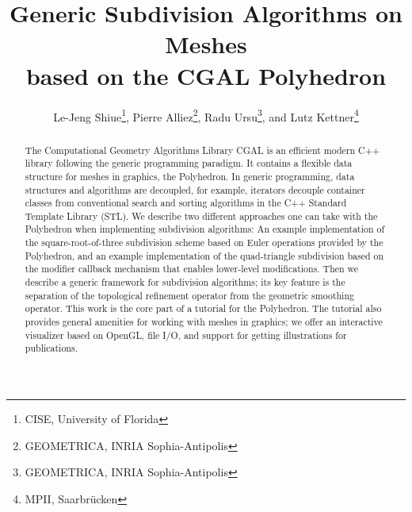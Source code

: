 \documentclass{egpubl}
\title{Generic Subdivision Algorithms on Meshes \\ 
       based on the CGAL Polyhedron}
\author[Le-Jeng Shiue, Pierre Alliez, Radu Ursu, and Lutz Kettner]
       {Le-Jeng Shiue\thanks{CISE, University of Florida},
        Pierre Alliez\thanks{GEOMETRICA, INRIA Sophia-Antipolis},
        Radu Ursu\thanks{GEOMETRICA, INRIA Sophia-Antipolis}, and
        Lutz Kettner\thanks{MPII, Saarbr\"ucken}
       }
\begin{document}
\maketitle

\begin{abstract}

  
The Computational Geometry Algorithms Library CGAL is an efficient
modern C++ library following the generic programming paradigm. It
contains a flexible data structure for meshes in graphics, the
Polyhedron. In generic programming, data structures and algorithms are
decoupled, for example, iterators decouple container classes from
conventional search and sorting algorithms in the C++ Standard
Template Library (STL). We describe two different approaches one can
take with the Polyhedron when implementing subdivision algorithms: An
example implementation of the square-root-of-three subdivision scheme
based on Euler operations provided by the Polyhedron, and an example
implementation of the quad-triangle subdivision based on the modifier
callback mechanism that enables lower-level modifications. Then we
describe a generic framework for subdivision algorithms; its key
feature is the separation of the topological refinement operator from
the geometric smoothing operator. This work is the core part of a
tutorial for the Polyhedron. The tutorial also provides general
amenities for working with meshes in graphics; we offer an interactive
visualizer based on OpenGL, file I/O, and support for getting
illustrations for publications.



  \begin{classification} %
  \end{classification}

\end{abstract}
\end{document}
